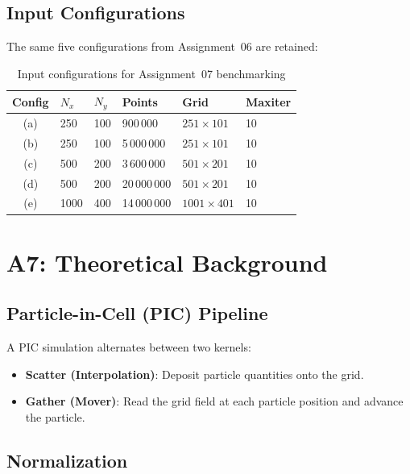 \documentclass[12pt,a4paper]{article}
\begin{document}
\subsection{Input Configurations}

The same five configurations from Assignment~06 are retained:

\begin{table}[H]
\centering
\caption{Input configurations for Assignment~07 benchmarking}
\begin{tabular}{clllll}
\toprule
\textbf{Config} & $N_x$ & $N_y$ & \textbf{Points} & \textbf{Grid} & \textbf{Maxiter} \\
\midrule
(a) & 250  & 100 &  900\,000 & $251\times101$    & 10 \\
(b) & 250  & 100 & 5\,000\,000 & $251\times101$  & 10 \\
(c) & 500  & 200 & 3\,600\,000 & $501\times201$  & 10 \\
(d) & 500  & 200 & 20\,000\,000 & $501\times201$ & 10 \\
(e) & 1000 & 400 & 14\,000\,000 & $1001\times401$ & 10 \\
\bottomrule
\end{tabular}
\end{table}

\section{A7: Theoretical Background}

\subsection{Particle-in-Cell (PIC) Pipeline}

A PIC simulation alternates between two kernels:
\begin{itemize}
    \item \textbf{Scatter (Interpolation)}: Deposit particle quantities onto the grid.
    \item \textbf{Gather (Mover)}: Read the grid field at each particle position and advance
          the particle.
\end{itemize}

\subsection{Normalization}
\end{document}
